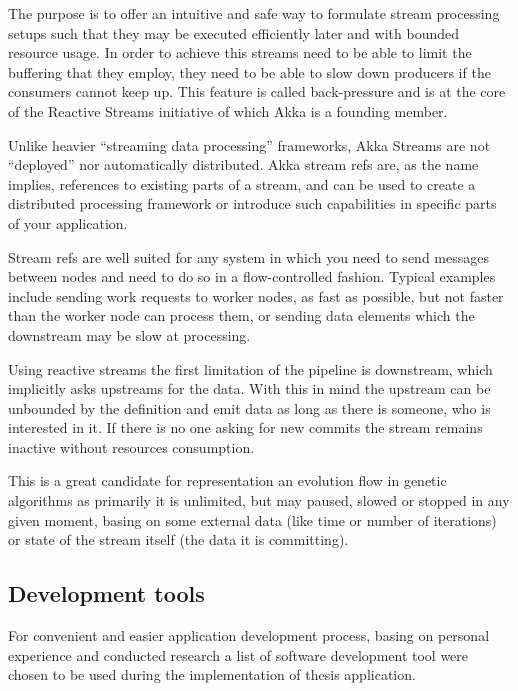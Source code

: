 The purpose is to offer an intuitive and safe way to formulate stream processing setups such that they may be executed efficiently later and with bounded resource usage. In order to achieve this  streams need to be able to limit the buffering that they employ, they need to be able to slow down producers if the consumers cannot keep up. This feature is called back-pressure and is at the core of the Reactive Streams initiative of which Akka is a founding member.

Unlike heavier “streaming data processing” frameworks, Akka Streams are not “deployed” nor automatically distributed. Akka stream refs are, as the name implies, references to existing parts of a stream, and can be used to create a distributed processing framework or introduce such capabilities in specific parts of your application.

Stream refs are well suited for any system in which you need to send messages between nodes and need to do so in a flow-controlled fashion. Typical examples include sending work requests to worker nodes, as fast as possible, but not faster than the worker node can process them, or sending data elements which the downstream may be slow at processing. \cite{stream_refs}

Using reactive streams the first limitation of the pipeline is downstream, which implicitly asks upstreams for the data. With this in mind the upstream can be unbounded by the definition and emit data as long as there is someone, who is interested in it. If there is no one asking for new commits the stream remains inactive without resources consumption. 

This is a great candidate for representation an evolution flow in genetic algorithms as primarily it is unlimited, but may paused, slowed or stopped in any given moment, basing on some external data (like time or number of iterations) or state of the stream itself (the data it is committing).

\subsection{Development tools}
For convenient and easier application development process, basing on personal experience and conducted research a list of software development tool were chosen to be used during the implementation of thesis application.

